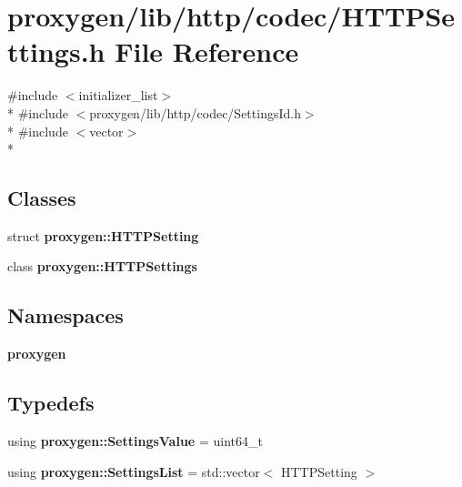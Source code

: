 \section{proxygen/lib/http/codec/\+H\+T\+T\+P\+Settings.h File Reference}
\label{HTTPSettings_8h}
{\ttfamily \#include $<$initializer\+\_\+list$>$}\\*
{\ttfamily \#include $<$proxygen/lib/http/codec/\+Settings\+Id.\+h$>$}\\*
{\ttfamily \#include $<$vector$>$}\\*
\subsection*{Classes}
\begin{DoxyCompactItemize}
\item 
struct {\bf proxygen\+::\+H\+T\+T\+P\+Setting}
\item 
class {\bf proxygen\+::\+H\+T\+T\+P\+Settings}
\end{DoxyCompactItemize}
\subsection*{Namespaces}
\begin{DoxyCompactItemize}
\item 
 {\bf proxygen}
\end{DoxyCompactItemize}
\subsection*{Typedefs}
\begin{DoxyCompactItemize}
\item 
using {\bf proxygen\+::\+Settings\+Value} = uint64\+\_\+t
\item 
using {\bf proxygen\+::\+Settings\+List} = std\+::vector$<$ H\+T\+T\+P\+Setting $>$
\end{DoxyCompactItemize}
